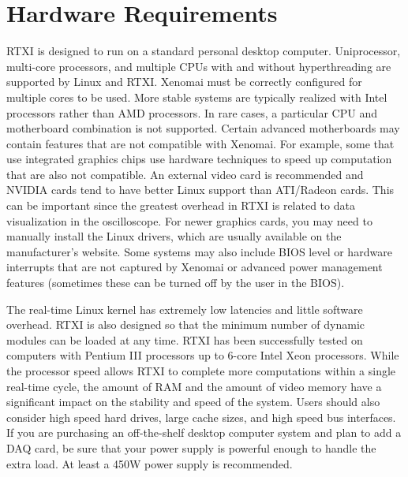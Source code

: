 \section{Hardware Requirements}

 
RTXI is designed to run on a standard personal desktop computer. Uniprocessor, multi-core processors, and multiple CPUs with and without hyperthreading are supported by Linux and RTXI. Xenomai must be correctly configured for multiple cores to be used. More stable systems are typically realized with Intel processors rather than AMD processors. In rare cases, a particular CPU and motherboard combination is not supported. Certain advanced motherboards may contain features that are not compatible with Xenomai. For example, some that use integrated graphics chips use hardware techniques to speed up computation that are also not compatible. An external video card is recommended and NVIDIA cards tend to have better Linux support than ATI/Radeon cards. This can be important since the greatest overhead in RTXI is related to data visualization in the oscilloscope. For newer graphics cards, you may need to manually install the Linux drivers, which are usually available on the manufacturer's website. Some systems may also include BIOS level or hardware interrupts that are not captured by Xenomai or advanced power management features (sometimes these can be turned off by the user in the BIOS).

The real-time Linux kernel has extremely low latencies and little software overhead. RTXI is also designed so that the minimum number of dynamic modules can be loaded at any time. RTXI has been successfully tested on computers with Pentium III processors up to 6-core Intel Xeon processors. While the processor speed allows RTXI to complete more computations within a single real-time cycle, the amount of RAM and the amount of video memory have a significant impact on the stability and speed of the system. Users should also consider high speed hard drives, large cache sizes, and high speed bus interfaces. If you are purchasing an off-the-shelf desktop computer system and plan to add a DAQ card, be sure that your power supply is powerful enough to handle the extra load. At least a 450W power supply is recommended.